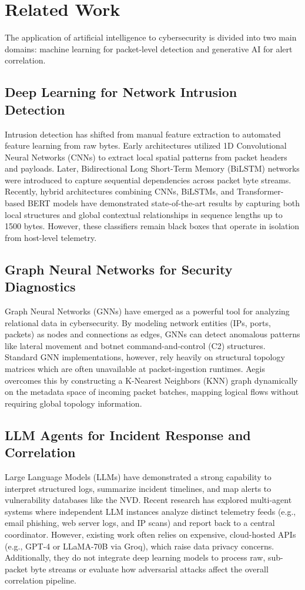 \documentclass[journal,twoside]{IEEEtran}
\begin{document}
\section{Related Work}
\label{sec:related_work}
The application of artificial intelligence to cybersecurity is divided into two main domains: machine learning for packet-level detection and generative AI for alert correlation.

\subsection{Deep Learning for Network Intrusion Detection}
Intrusion detection has shifted from manual feature extraction to automated feature learning from raw bytes. Early architectures utilized 1D Convolutional Neural Networks (CNNs) to extract local spatial patterns from packet headers and payloads. Later, Bidirectional Long Short-Term Memory (BiLSTM) networks were introduced to capture sequential dependencies across packet byte streams. Recently, hybrid architectures combining CNNs, BiLSTMs, and Transformer-based BERT models have demonstrated state-of-the-art results by capturing both local structures and global contextual relationships in sequence lengths up to 1500 bytes. However, these classifiers remain black boxes that operate in isolation from host-level telemetry.

\subsection{Graph Neural Networks for Security Diagnostics}
Graph Neural Networks (GNNs) have emerged as a powerful tool for analyzing relational data in cybersecurity. By modeling network entities (IPs, ports, packets) as nodes and connections as edges, GNNs can detect anomalous patterns like lateral movement and botnet command-and-control (C2) structures. Standard GNN implementations, however, rely heavily on structural topology matrices which are often unavailable at packet-ingestion runtimes. Aegis overcomes this by constructing a K-Nearest Neighbors (KNN) graph dynamically on the metadata space of incoming packet batches, mapping logical flows without requiring global topology information.

\subsection{LLM Agents for Incident Response and Correlation}
Large Language Models (LLMs) have demonstrated a strong capability to interpret structured logs, summarize incident timelines, and map alerts to vulnerability databases like the NVD. Recent research has explored multi-agent systems where independent LLM instances analyze distinct telemetry feeds (e.g., email phishing, web server logs, and IP scans) and report back to a central coordinator. However, existing work often relies on expensive, cloud-hosted APIs (e.g., GPT-4 or LLaMA-70B via Groq), which raise data privacy concerns. Additionally, they do not integrate deep learning models to process raw, sub-packet byte streams or evaluate how adversarial attacks affect the overall correlation pipeline.
\end{document}
